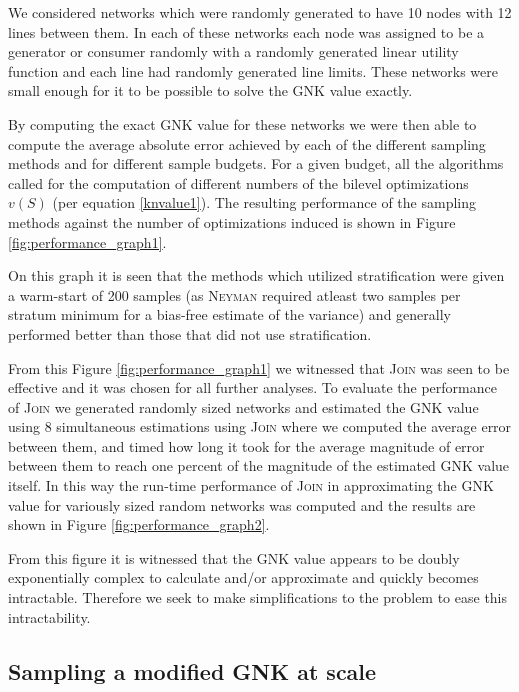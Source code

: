 We considered networks which were randomly generated to have 10 nodes with 12 lines between them.
In each of these networks each node was assigned to be a generator or consumer randomly with a randomly generated linear utility function and each line had randomly generated line limits.
These networks were small enough for it to be possible to solve the GNK value exactly.

By computing the exact GNK value for these networks we were then able to compute the average absolute error achieved by each of the different sampling methods and for different sample budgets.
For a given budget, all the algorithms called for the computation of different numbers of the bilevel optimizations $v(S)$ (per equation \eqref{knvalue1}).
The resulting performance of the sampling methods against the number of optimizations induced is shown in Figure \ref{fig:performance_graph1}.

On this graph it is seen that the methods which utilized stratification were given a warm-start of 200 samples (as \textsc{Neyman} required atleast two samples per stratum minimum for a bias-free estimate of the variance) and generally performed better than those that did not use stratification.

From this Figure \ref{fig:performance_graph1} we witnessed that \textsc{Join} was seen to be effective and it was chosen for all further analyses.
To evaluate the performance of \textsc{Join} we generated randomly sized networks and estimated the GNK value using 8 simultaneous estimations using \textsc{Join} where we computed the average error between them, and timed how long it took for the average magnitude of error between them to reach one percent of the magnitude of the estimated GNK value itself.
In this way the run-time performance of \textsc{Join} in approximating the GNK value for variously sized random networks was computed and the results are shown in Figure \ref{fig:performance_graph2}.

From this figure it is witnessed that the GNK value appears to be doubly exponentially complex to calculate and/or approximate and quickly becomes intractable.
Therefore we seek to make simplifications to the problem to ease this intractability.


\iffigures

\fi

\iffigures


\fi

\newpage

\subsection{Sampling a modified GNK at scale}\label{sec:modified_gnk}

